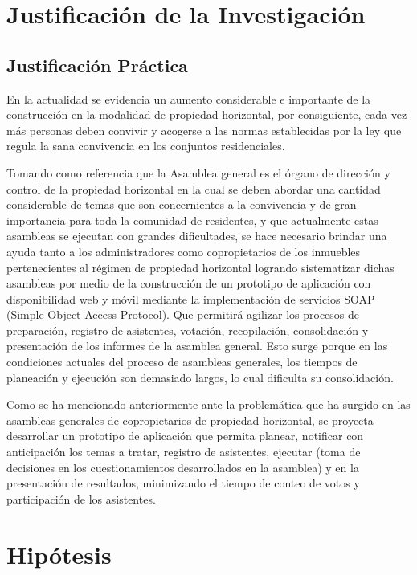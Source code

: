 \section{Justificación de la Investigación}

\subsection{Justificación Práctica}

En la actualidad se evidencia un aumento considerable e importante de la construcción en la modalidad de propiedad horizontal, por consiguiente, cada vez más personas deben convivir y acogerse a las normas establecidas por la ley que regula la sana convivencia en los conjuntos residenciales. 

Tomando como referencia que la Asamblea general es el órgano de dirección y control de la propiedad horizontal en la cual se deben abordar una cantidad considerable de temas que son concernientes a la convivencia y de gran importancia para toda la comunidad de residentes,  y que actualmente estas asambleas se ejecutan con grandes dificultades, se hace necesario brindar una ayuda tanto a los administradores como copropietarios de los inmuebles pertenecientes al régimen de propiedad horizontal logrando sistematizar dichas asambleas por medio de la construcción de un prototipo de aplicación con disponibilidad web y móvil mediante la implementación de servicios SOAP (Simple Object Access Protocol).  Que permitirá agilizar los procesos de preparación, registro de asistentes, votación, recopilación, consolidación y presentación de los informes de la asamblea general. Esto surge porque en las condiciones actuales del proceso de asambleas generales, los tiempos de planeación y ejecución son demasiado largos, lo cual dificulta su consolidación.

Como se ha mencionado anteriormente ante la problemática que ha surgido en las asambleas generales de copropietarios de propiedad horizontal, se proyecta desarrollar un prototipo de aplicación que permita planear, notificar con anticipación los temas a tratar, registro de asistentes, ejecutar (toma de decisiones en los cuestionamientos desarrollados en la asamblea) y en la presentación de resultados, minimizando el tiempo de conteo de votos y participación de los asistentes.

\section{Hipótesis}

